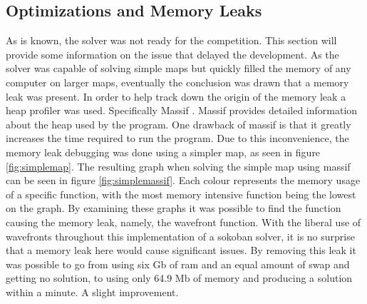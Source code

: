 \subsection{Optimizations and Memory Leaks}
As is known, the solver was not ready for the competition. 
This section will provide some information on the issue that delayed the development. 
As the solver was capable of solving simple maps but quickly filled the memory of any computer on larger maps, eventually the conclusion was drawn that a memory leak was present.
In order to help track down the origin of the memory leak a heap profiler was used. Specifically Massif \cite{massif}.
Massif provides detailed information about the heap used by the program.
One drawback of massif is that it greatly increases the time required to run the program.
Due to this inconvenience, the memory leak debugging was done using a simpler map, as seen in figure \ref{fig:simplemap}.
The resulting graph when solving the simple map using massif can be seen in figure \ref{fig:simplemassif}.
Each colour represents the memory usage of a specific function, with the most memory intensive function being the lowest on the graph.
By examining these graphs it was possible to find the function causing the memory leak, namely, the wavefront function.
With the liberal use of wavefronts throughout this implementation of a sokoban solver, it is no surprise that a memory leak here would cause significant issues.
By removing this leak it was possible to go from using six Gb of ram and an equal amount of swap and getting no solution, to using only 64.9 Mb of memory and producing a solution within a minute.
A slight improvement.